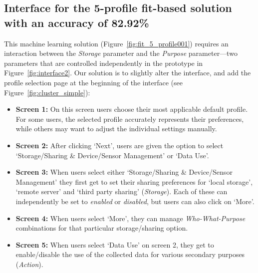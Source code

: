 \subsection{Interface for the 5-profile fit-based solution with an accuracy of 82.92\%}\label{sec:fit_simple}
This machine learning solution (Figure~\ref{fig:fit_5_profile001}) requires an interaction between the \emph{Storage} parameter and the \emph{Purpose} parameter---two parameters that are controlled independently in the prototype in Figure~\ref{fig:interface2}. Our solution is to slightly alter the interface, and add the profile selection page at the beginning of the interface (see Figure~\ref{fig:cluster_simple}): 
\begin{itemize}
	\item \textbf{Screen 1:} On this screen users choose their most applicable default profile. For some users, the selected profile accurately represents their preferences, while others may want to adjust the individual settings manually.
	\item \textbf{Screen 2:} After clicking `Next', users are given the option to select `Storage/Sharing  \& Device/Sensor Management' or `Data Use'.
	\item \textbf{Screen 3:} When users select either `Storage/Sharing \& Device/Sensor Management' they first get to set their sharing preferences for `local storage', `remote server' and `third party sharing' (\emph{Storage}). Each of these can independently be set to \emph{enabled} or \emph{disabled}, but users can also click on `More'. 
	\item \textbf{Screen 4:} When users select `More', they can manage \emph{Who-What-Purpose} combinations for that particular storage/sharing option.
	\item \textbf{Screen 5:} When users select `Data Use' on screen 2, they get to enable/disable the use of the collected data for various secondary purposes (\emph{Action}). 
\end{itemize}

